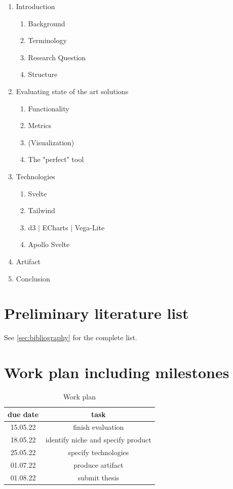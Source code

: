 \documentclass[authoryear,preprint,review,12pt]{elsarticle}
\begin{document}
\begin{enumerate}
  \item Introduction
        \begin{enumerate}
          \item Background
          \item Terminology
          \item Research Question
          \item Structure
        \end{enumerate}
  \item Evaluating state of the art solutions
        \begin{enumerate}
          \item Functionality
          \item Metrics
          \item (Visualization)
          \item The "perfect" tool
        \end{enumerate}
  \item Technologies
        \begin{enumerate}
          \item Svelte
          \item Tailwind
          \item d3 $\mid$ ECharts $\mid$ Vega-Lite
          \item Apollo Svelte
        \end{enumerate}
  \item Artifact
  \item Conclusion
\end{enumerate}

\section{Preliminary literature list}
\label{sec:literature}

See \ref{sec:bibliography} for the complete list.

\section{Work plan including milestones}
\label{sec:workplan}
\begin{table}[h]
  \centering\begin{tabular}{ |c | c| }
    \hline
    due date & task                               \\
    \hline
    15.05.22 & finish evaluation                  \\
    \hline
    18.05.22 & identify niche and specify product \\
    \hline
    25.05.22 & specify technologies               \\
    \hline
    01.07.22 & produce artifact                   \\
    \hline
    01.08.22 & submit thesis                      \\
    \hline
  \end{tabular}
  \caption{Work plan}
  \label{fig:workplan}
\end{table}
\listoffigures
\listoftables

\nocite{*}


\label{sec:bibliography}
\end{document}

